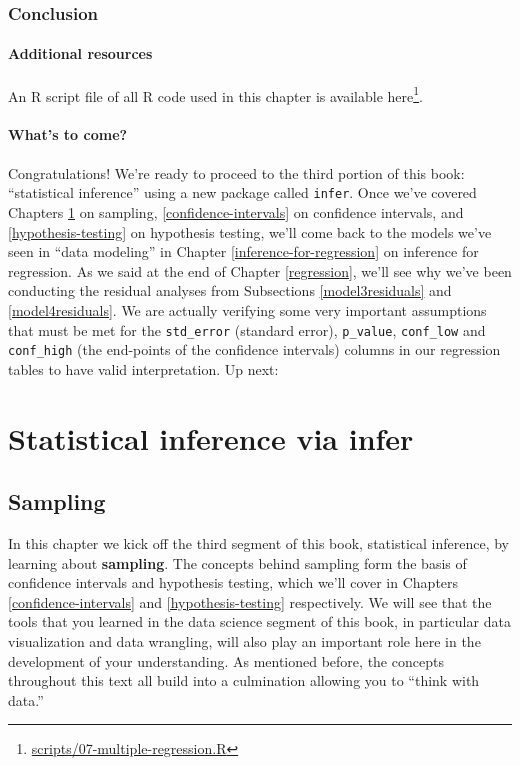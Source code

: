 \documentclass[12pt, krantz2,]{krantz}
\renewcommand{\href}[2]{#2\footnote{\url{#1}}}
\begin{document}
\hypertarget{conclusion-5}{%
\section{Conclusion}\label{conclusion-5}}

\hypertarget{additional-resources-5}{%
\subsection{Additional resources}\label{additional-resources-5}}

An R script file of all R code used in this chapter is available \href{scripts/07-multiple-regression.R}{here}.

\hypertarget{whats-to-come-5}{%
\subsection{What's to come?}\label{whats-to-come-5}}

Congratulations! We're ready to proceed to the third portion of this book: ``statistical inference'' using a new package called \texttt{infer}. Once we've covered Chapters \ref{sampling} on sampling, \ref{confidence-intervals} on confidence intervals, and \ref{hypothesis-testing} on hypothesis testing, we'll come back to the models we've seen in ``data modeling'' in Chapter \ref{inference-for-regression} on inference for regression. As we said at the end of Chapter \ref{regression}, we'll see why we've been conducting the residual analyses from Subsections \ref{model3residuals} and \ref{model4residuals}. We are actually verifying some very important assumptions that must be met for the \texttt{std\_error} (standard error), \texttt{p\_value}, \texttt{conf\_low} and \texttt{conf\_high} (the end-points of the confidence intervals) columns in our regression tables to have valid interpretation. Up next:

\hypertarget{part-statistical-inference-via-infer}{%
\part{Statistical inference via infer}\label{part-statistical-inference-via-infer}}

\hypertarget{sampling}{%
\chapter{Sampling}\label{sampling}}

In this chapter we kick off the third segment of this book, statistical inference, by learning about \textbf{sampling}. The concepts behind sampling form the basis of confidence intervals and hypothesis testing, which we'll cover in Chapters \ref{confidence-intervals} and \ref{hypothesis-testing} respectively. We will see that the tools that you learned in the data science segment of this book, in particular data visualization and data wrangling, will also play an important role here in the development of your understanding. As mentioned before, the concepts throughout this text all build into a culmination allowing you to ``think with data.''
\end{document}
